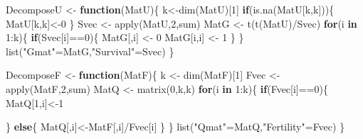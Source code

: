 \documentclass[
]{book}
\newenvironment{Shaded}{\begin{snugshade}}{\end{snugshade}}
\newcommand{\ControlFlowTok}[1]{\textcolor[rgb]{0.13,0.29,0.53}{\textbf{#1}}}
\newcommand{\DecValTok}[1]{\textcolor[rgb]{0.00,0.00,0.81}{#1}}
\newcommand{\FunctionTok}[1]{\textcolor[rgb]{0.00,0.00,0.00}{#1}}
\newcommand{\NormalTok}[1]{#1}
\newcommand{\OtherTok}[1]{\textcolor[rgb]{0.56,0.35,0.01}{#1}}
\newcommand{\SpecialCharTok}[1]{\textcolor[rgb]{0.00,0.00,0.00}{#1}}
\newcommand{\StringTok}[1]{\textcolor[rgb]{0.31,0.60,0.02}{#1}}
\begin{document}
\begin{Shaded}
\begin{Highlighting}[]
\NormalTok{DecomposeU }\OtherTok{\textless{}{-}} \ControlFlowTok{function}\NormalTok{(MatU)\{}
\NormalTok{  k}\OtherTok{\textless{}{-}}\FunctionTok{dim}\NormalTok{(MatU)[}\DecValTok{1}\NormalTok{]}
  \ControlFlowTok{if}\NormalTok{(}\FunctionTok{is.na}\NormalTok{(MatU[k,k]))\{}
\NormalTok{    MatU[k,k]}\OtherTok{\textless{}{-}}\DecValTok{0}
\NormalTok{  \}}
\NormalTok{  Svec }\OtherTok{\textless{}{-}} \FunctionTok{apply}\NormalTok{(MatU,}\DecValTok{2}\NormalTok{,sum)}
\NormalTok{  MatG }\OtherTok{\textless{}{-}} \FunctionTok{t}\NormalTok{(}\FunctionTok{t}\NormalTok{(MatU)}\SpecialCharTok{/}\NormalTok{Svec)}
  \ControlFlowTok{for}\NormalTok{(i }\ControlFlowTok{in} \DecValTok{1}\SpecialCharTok{:}\NormalTok{k)\{}
    \ControlFlowTok{if}\NormalTok{(Svec[i]}\SpecialCharTok{==}\DecValTok{0}\NormalTok{)\{}
\NormalTok{      MatG[,i] }\OtherTok{\textless{}{-}} \DecValTok{0}
\NormalTok{      MatG[i,i] }\OtherTok{\textless{}{-}} \DecValTok{1}
\NormalTok{    \}}
\NormalTok{  \}}
 \FunctionTok{list}\NormalTok{(}\StringTok{"Gmat"}\OtherTok{=}\NormalTok{MatG,}\StringTok{"Survival"}\OtherTok{=}\NormalTok{Svec)}
\NormalTok{\}}
\end{Highlighting}
\end{Shaded}

\begin{Shaded}
\begin{Highlighting}[]
\NormalTok{DecomposeF }\OtherTok{\textless{}{-}} \ControlFlowTok{function}\NormalTok{(MatF)\{}
\NormalTok{    k }\OtherTok{\textless{}{-}} \FunctionTok{dim}\NormalTok{(MatF)[}\DecValTok{1}\NormalTok{]}
\NormalTok{    Fvec }\OtherTok{\textless{}{-}} \FunctionTok{apply}\NormalTok{(MatF,}\DecValTok{2}\NormalTok{,sum)}
\NormalTok{    MatQ }\OtherTok{\textless{}{-}} \FunctionTok{matrix}\NormalTok{(}\DecValTok{0}\NormalTok{,k,k)}
    \ControlFlowTok{for}\NormalTok{(i }\ControlFlowTok{in} \DecValTok{1}\SpecialCharTok{:}\NormalTok{k)\{}
        \ControlFlowTok{if}\NormalTok{(Fvec[i]}\SpecialCharTok{==}\DecValTok{0}\NormalTok{)\{}
\NormalTok{            MatQ[}\DecValTok{1}\NormalTok{,i]}\OtherTok{\textless{}{-}}\DecValTok{1}
            
\NormalTok{        \}}
        \ControlFlowTok{else}\NormalTok{\{}
\NormalTok{            MatQ[,i]}\OtherTok{\textless{}{-}}\NormalTok{MatF[,i]}\SpecialCharTok{/}\NormalTok{Fvec[i]}
\NormalTok{        \}}
\NormalTok{    \}}
 \FunctionTok{list}\NormalTok{(}\StringTok{"Qmat"}\OtherTok{=}\NormalTok{MatQ,}\StringTok{"Fertility"}\OtherTok{=}\NormalTok{Fvec)}
\NormalTok{\}}
\end{Highlighting}
\end{Shaded}
\end{document}
